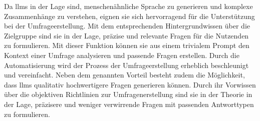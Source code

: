 Da \acp{llm} in der Lage sind, menschenähnliche Sprache zu generieren und komplexe Zusammenhänge zu verstehen, eignen sie sich hervorragend für die Unterstützung bei der Umfrageerstellung. Mit dem entsprechenden Hintergrundwissen über die Zielgruppe sind sie in der Lage, präzise und relevante Fragen für die Nutzenden zu formulieren. Mit dieser Funktion können sie aus einem trivialem Prompt den Kontext einer Umfrage analysieren und passende Fragen erstellen. Durch die Automatisierung wird der Prozess der Umfrageerstellung erheblich beschleunigt und vereinfacht. Neben dem genannten Vorteil besteht zudem die Möglichkeit, dass \acp{llm} qualitativ hochwertigere Fragen generieren können. Durch ihr Vorwissen über die objektiven Richtlinien zur Umfragenerstellung sind sie in der Theorie in der Lage, präzisere und weniger verwirrende Fragen mit passenden Antworttypen zu formulieren.  



